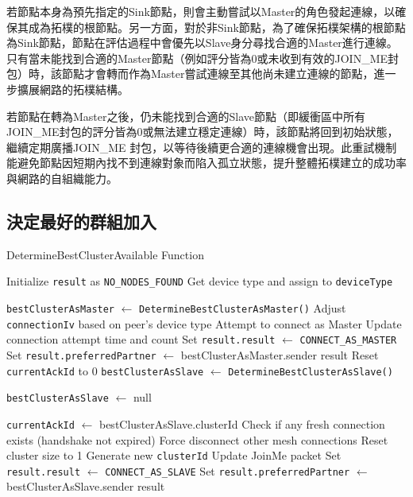 \begin{ZhChapter}
若節點本身為預先指定的Sink節點，則會主動嘗試以Master的角色發起連線，以確保其成為拓樸的根節點。另一方面，對於非Sink節點，為了確保拓樸架構的根節點為Sink節點，節點在評估過程中會優先以Slave身分尋找合適的Master進行連線。只有當未能找到合適的Master節點（例如評分皆為0或未收到有效的JOIN\_ME封包）時，該節點才會轉而作為Master嘗試連線至其他尚未建立連線的節點，進一步擴展網路的拓樸結構。

若節點在轉為Master之後，仍未能找到合適的Slave節點（即緩衝區中所有JOIN\_ME封包的評分皆為0或無法建立穩定連線）時，該節點將回到初始狀態，繼續定期廣播JOIN\_ME 封包，以等待後續更合適的連線機會出現。此重試機制能避免節點因短期內找不到連線對象而陷入孤立狀態，提升整體拓樸建立的成功率與網路的自組織能力。

\subsection{決定最好的群組加入}

\begin{algorithm}[H]
\caption{DetermineBestClusterAvailable Function}
\label{alg: DetermineBestClusterAvailable}
\begin{algorithmic}[1]
\State Initialize \texttt{result} as \texttt{NO\_NODES\_FOUND}
\State Get device type and assign to \texttt{deviceType}

    \State \texttt{bestClusterAsMaster} $\gets$ \texttt{DetermineBestClusterAsMaster()}
        \State Adjust \texttt{connectionIv} based on peer’s device type
        \State Attempt to connect as Master
            \State Update connection attempt time and count
        \EndIf
        \State Set \texttt{result.result} $\gets$ \texttt{CONNECT\_AS\_MASTER}
        \State Set \texttt{result.preferredPartner} $\gets$ bestClusterAsMaster.sender
        \State \Return result
    \EndIf
\Else
    \State Reset \texttt{currentAckId} to 0
    \State \texttt{bestClusterAsSlave} $\gets$ \texttt{DetermineBestClusterAsSlave()}

        \State \texttt{bestClusterAsSlave} $\gets$ null
    \EndIf

        \State \texttt{currentAckId} $\gets$ bestClusterAsSlave.clusterId
            \State Check if any fresh connection exists (handshake not expired)
                    \State Force disconnect other mesh connections
                    \State Reset cluster size to 1
                    \State Generate new \texttt{clusterId}
                \EndIf
            \EndIf
        \EndIf
        \State Update JoinMe packet
        \State Set \texttt{result.result} $\gets$ \texttt{CONNECT\_AS\_SLAVE}
        \State Set \texttt{result.preferredPartner} $\gets$ bestClusterAsSlave.sender
        \State \Return result
    \EndIf


\end{algorithmic}
\end{algorithm}
\end{ZhChapter}
